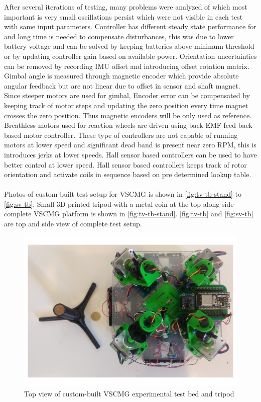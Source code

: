 After several iterations of testing, many problems were analyzed of which most important is very small oscillations persist which were not visible in each test with same input parameters. Controller has different steady state performance for and long time is needed to compensate disturbances, this was due to lower battery voltage and can be solved by keeping batteries above minimum threshold or by updating controller gain based on available power. Orientation uncertainties can be removed by recording IMU offset and introducing offset rotation matrix. Gimbal angle is measured through magnetic encoder which provide absolute angular feedback but are not linear due to offset in sensor and shaft magnet. Since steeper motors are used for gimbal, Encoder error can be compensated by keeping track of motor steps and updating the zero position every time magnet crosses the zero position. Thus magnetic encoders will be only used as reference. Breathless motors used for reaction wheels are driven using back EMF feed back based motor controller. These type of controllers are not capable of running motors at lower speed and significant dead band is present near zero RPM, this is introduces jerks at lower speeds. Hall sensor based controllers can be used to have better control at lower speed. Hall sensor based controllers keeps track of rotor orientation and activate coils in sequence based on pre determined lookup table.
\\
\\
Photos of custom-built test setup for VSCMG is shown in \autoref{fig:tv-tb-stand} to \autoref{fig:sv-tb}. Small 3D printed tripod with a metal coin at the top along side complete VSCMG platform is shown in \autoref{fig:tv-tb-stand}. \autoref{fig:tv-tb} and \autoref{fig:sv-tb} are top and side view of complete test setup.

\begin{figure}
    \centering
    \includegraphics[width=\textwidth]{figures/photos/tb-stand-tv.pdf}
    \caption{Top view of custom-built VSCMG experimental test bed and tripod}
    \label{fig:tv-tb-stand}
\end{figure}

